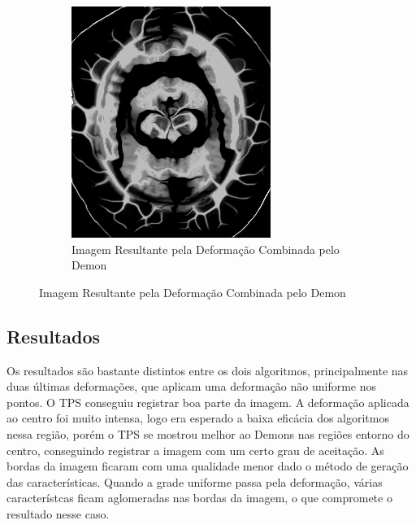 \documentclass[]{spie}  %
\begin{document}
\begin{figure}[h]
\begin{subfigure}[t]{0.16\textwidth}
	  \includegraphics[width=\textwidth]{../images/resultSinDistDemon.png}
	  \caption{Imagem Resultante pela Deformação Combinada pelo Demon}
	  \label{fig:sindist-image-demon}
	\end{subfigure}
\end{figure}
	
\subsection{Resultados}
	Os resultados são bastante distintos entre os dois algoritmos, principalmente nas duas últimas deformações, que
aplicam uma deformação não uniforme nos pontos. O TPS conseguiu registrar boa parte da imagem. A deformação aplicada ao
centro foi muito intensa, logo era esperado a baixa eficácia dos algoritmos nessa região, porém o TPS se mostrou melhor
ao Demons nas regiões entorno do centro, conseguindo registrar a imagem com um certo grau de aceitação. As bordas da imagem
ficaram com uma qualidade menor dado o método de geração das características. Quando a grade uniforme passa pela deformação, 
várias característcas ficam aglomeradas nas bordas da imagem, o que compromete o resultado nesse caso.
\end{document}
